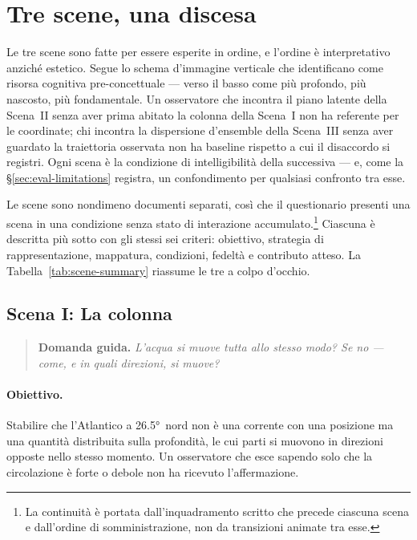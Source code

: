 \section{Tre scene, una discesa}
\label{sec:three-scenes}

Le tre scene sono fatte per essere esperite in ordine, e l'ordine è interpretativo anziché estetico. Segue lo schema d'immagine verticale che \citet{lakoff1999} identificano come risorsa cognitiva pre-concettuale --- verso il basso come più profondo, più nascosto, più fondamentale. Un osservatore che incontra il piano latente della Scena~II senza aver prima abitato la colonna della Scena~I non ha referente per le coordinate; chi incontra la dispersione d'ensemble della Scena~III senza aver guardato la traiettoria osservata non ha baseline rispetto a cui il disaccordo si registri. Ogni scena è la condizione di intelligibilità della successiva --- e, come la \S\ref{sec:eval-limitations} registra, un confondimento per qualsiasi confronto tra esse.

Le scene sono nondimeno documenti separati, così che il questionario presenti una scena in una condizione senza stato di interazione accumulato.\footnote{La continuità è portata dall'inquadramento scritto che precede ciascuna scena e dall'ordine di somministrazione, non da transizioni animate tra esse.} Ciascuna è descritta più sotto con gli stessi sei criteri: obiettivo, strategia di rappresentazione, mappatura, condizioni, fedeltà e contributo atteso. La Tabella~\ref{tab:scene-summary} riassume le tre a colpo d'occhio.

\subsection{Scena I: La colonna}
\label{subsec:scene-column}

\begin{quote}
\textbf{Domanda guida.} \emph{L'acqua si muove tutta allo stesso modo? Se no --- come, e in quali direzioni, si muove?}
\end{quote}



\paragraph{Obiettivo.} Stabilire che l'Atlantico a \ang{26.5}~nord non è una corrente con una posizione ma una quantità distribuita sulla profondità, le cui parti si muovono in direzioni opposte nello stesso momento. Un osservatore che esce sapendo solo che la circolazione è forte o debole non ha ricevuto l'affermazione.

